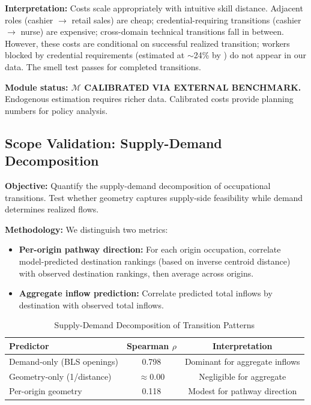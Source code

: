 \documentclass[12pt]{article}
\begin{document}
\textbf{Interpretation:} Costs scale appropriately with intuitive skill distance. Adjacent roles (cashier $\to$ retail sales) are cheap; credential-requiring transitions (cashier $\to$ nurse) are expensive; cross-domain technical transitions fall in between. However, these costs are conditional on successful realized transition; workers blocked by credential requirements (estimated at $\sim$24\% by \citealt{Jackson2023}) do not appear in our data. The smell test passes for completed transitions.

\textbf{Module status: $\mathcal{M}$ CALIBRATED VIA EXTERNAL BENCHMARK.} Endogenous estimation requires richer data. Calibrated costs provide planning numbers for policy analysis.


\subsection{Scope Validation: Supply-Demand Decomposition}
\label{subsec:pathway-validation}


\textbf{Objective:} Quantify the supply-demand decomposition of occupational transitions. Test whether geometry captures supply-side feasibility while demand determines realized flows.

\textbf{Methodology:} We distinguish two metrics:
\begin{itemize}
    \item \textbf{Per-origin pathway direction:} For each origin occupation, correlate model-predicted destination rankings (based on inverse centroid distance) with observed destination rankings, then average across origins.
    \item \textbf{Aggregate inflow prediction:} Correlate predicted total inflows by destination with observed total inflows.
\end{itemize}


\begin{table}[h!]
\centering
\caption{Supply-Demand Decomposition of Transition Patterns}
\label{tab:demand-decomposition}
\begin{tabular}{lcc}
\toprule
\textbf{Predictor} & \textbf{Spearman $\rho$} & \textbf{Interpretation} \\
\midrule
Demand-only (BLS openings) & 0.798 & Dominant for aggregate inflows \\
Geometry-only (1/distance) & $\approx$0.00 & Negligible for aggregate \\
Per-origin geometry & 0.118 & Modest for pathway direction \\
\bottomrule
\end{tabular}
\end{table}
\end{document}
